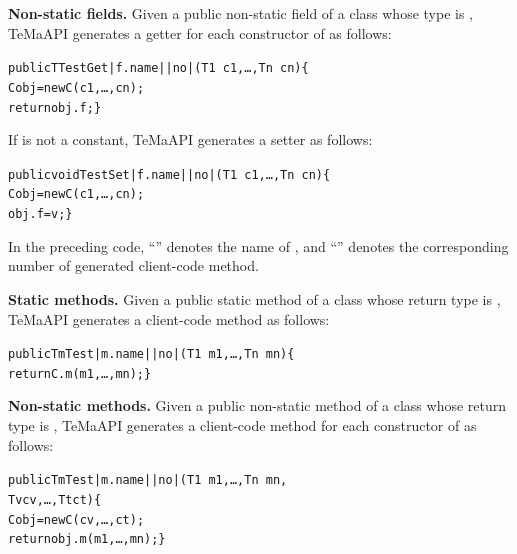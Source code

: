 \textbf{Non-static fields.} Given a public non-static field  of a class  whose type is , TeMaAPI generates a getter for each constructor  of  as follows:
\begin{CodeOut}%
\begin{alltt}
 public T TestGet|f.name||no|(T1\ c1,\ldots, Tn\ cn)\{
    C obj = new C(c1,\ldots, cn);
    return obj.f; \}
\end{alltt}
\end{CodeOut}

If  is not a constant, TeMaAPI generates a setter as follows:
\begin{CodeOut}%
\begin{alltt}
 public void TestSet|f.name||no|(T1\ c1,\ldots, Tn\ cn)\{
   C obj = new C(c1,\ldots, cn);
   obj.f = v; \}
\end{alltt}
\end{CodeOut}

In the preceding code, ``'' denotes the name of , and ``'' denotes the corresponding number of generated client-code method.

\textbf{Static methods.} Given a public static method  of a class  whose return type is , TeMaAPI generates a client-code method as follows:
\begin{CodeOut}%
\begin{alltt}
 public Tm Test|m.name||no|(T1\ m1,\ldots, Tn\ mn)\{
   return C.m(m1,\ldots, mn); \}
\end{alltt}
\end{CodeOut}

\textbf{Non-static methods.} Given a public non-static method  of a class  whose return type is , TeMaAPI generates a client-code method for each constructor  of  as follows:
\begin{CodeOut}%
\begin{alltt}
 public Tm Test|m.name||no|(T1\ m1,\ldots, Tn\ mn,
                            Tv cv, \ldots, Tt ct)\{
   C obj = new C(cv,\ldots, ct);
   return obj.m(m1,\ldots, mn); \}
\end{alltt}
\end{CodeOut}

